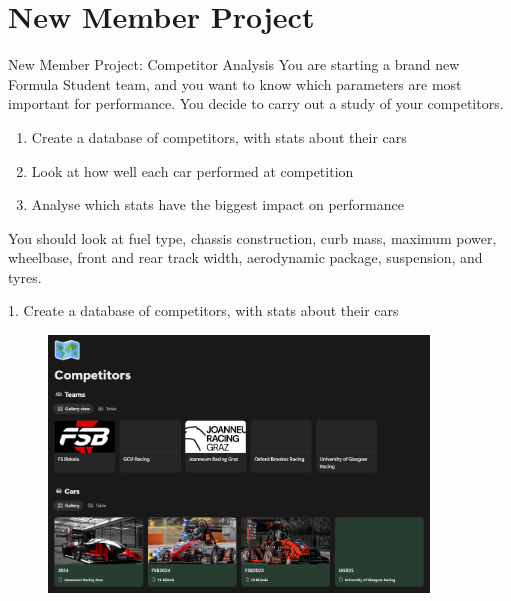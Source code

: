 \section{New Member Project}
\begin{frame}{New Member Project: Competitor Analysis}
    You are starting a brand new Formula Student team,
    and you want to know which parameters are most important for performance.
    You decide to carry out a study of your competitors.
    \vspace*{2ex}
    \begin{enumerate}
        \item Create a database of competitors, with stats about their cars
        \item Look at how well each car performed at competition
        \item Analyse which stats have the biggest impact on performance
    \end{enumerate}
    \vspace*{2ex}
    You should look at fuel type, chassis construction, curb mass,
    maximum power, wheelbase, front and rear track width,
    aerodynamic package, suspension, and tyres.
\end{frame}

\begin{frame}
    \begin{center}
        1. Create a database of competitors, with stats about their cars
        \begin{figure}
            \includegraphics[width=0.9\textwidth]{res/Notion Competitor Database.png}
        \end{figure}
    \end{center}
\end{frame}

